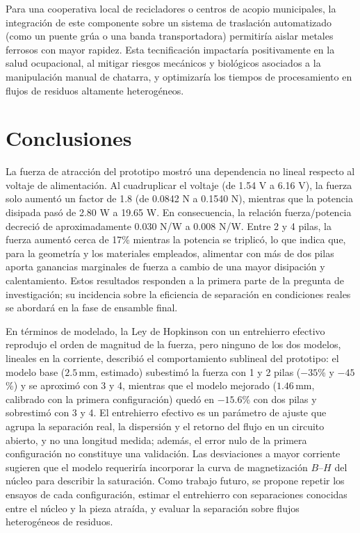 Para una cooperativa local de recicladores o centros de acopio municipales, la integración de este componente sobre un sistema de traslación automatizado (como un puente grúa o una banda transportadora) permitiría aislar metales ferrosos con mayor rapidez. Esta tecnificación impactaría positivamente en la salud ocupacional, al mitigar riesgos mecánicos y biológicos asociados a la manipulación manual de chatarra, y optimizaría los tiempos de procesamiento en flujos de residuos altamente heterogéneos.

\section{Conclusiones}

La fuerza de atracción del prototipo mostró una dependencia no lineal respecto al voltaje de alimentación. Al cuadruplicar el voltaje (de 1.54 V a 6.16 V), la fuerza solo aumentó un factor de 1.8 (de 0.0842 N a 0.1540 N), mientras que la potencia disipada pasó de 2.80 W a 19.65 W. En consecuencia, la relación fuerza/potencia decreció de aproximadamente 0.030 N/W a 0.008 N/W. Entre 2 y 4 pilas, la fuerza aumentó cerca de 17\% mientras la potencia se triplicó, lo que indica que, para la geometría y los materiales empleados, alimentar con más de dos pilas aporta ganancias marginales de fuerza a cambio de una mayor disipación y calentamiento. Estos resultados responden a la primera parte de la pregunta de investigación; su incidencia sobre la eficiencia de separación en condiciones reales se abordará en la fase de ensamble final.

En términos de modelado, la Ley de Hopkinson con un entrehierro efectivo reprodujo el orden de magnitud de la fuerza, pero ninguno de los dos modelos, lineales en la corriente, describió el comportamiento sublineal del prototipo: el modelo base ($2.5 \, \text{mm}$, estimado) subestimó la fuerza con 1 y 2 pilas ($-35$\% y $-45$\%) y se aproximó con 3 y 4, mientras que el modelo mejorado ($1.46 \, \text{mm}$, calibrado con la primera configuración) quedó en $-15.6$\% con dos pilas y sobrestimó con 3 y 4. El entrehierro efectivo es un parámetro de ajuste que agrupa la separación real, la dispersión y el retorno del flujo en un circuito abierto, y no una longitud medida; además, el error nulo de la primera configuración no constituye una validación. Las desviaciones a mayor corriente sugieren que el modelo requeriría incorporar la curva de magnetización $B$--$H$ del núcleo para describir la saturación. Como trabajo futuro, se propone repetir los ensayos de cada configuración, estimar el entrehierro con separaciones conocidas entre el núcleo y la pieza atraída, y evaluar la separación sobre flujos heterogéneos de residuos.


